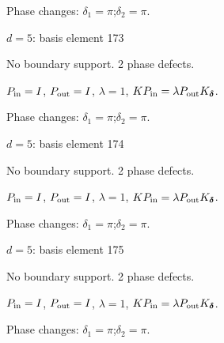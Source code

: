 \par\smallskip\begin{minipage}{.98\linewidth}\small Phase changes: $\delta_{1}=\pi$;\quad $\delta_{2}=\pi$.\end{minipage}
\vfill
{\footnotesize\texttt{}}
\newpage
{}
{\Large $d=5$: basis element 173}\par
No boundary support. 2 phase defects.
\begin{center}
\end{center}
\vspace{-1mm}
$P_{\rm in}=I$, \quad $P_{\rm out}=I$, \quad $\lambda=1$, \qquad $K P_{\rm in}=\lambda P_{\rm out}K_{\boldsymbol\delta}$.
\par\smallskip\begin{minipage}{.98\linewidth}\small Phase changes: $\delta_{1}=\pi$;\quad $\delta_{2}=\pi$.\end{minipage}
\vfill
{\footnotesize\texttt{}}
\newpage
{}
{\Large $d=5$: basis element 174}\par
No boundary support. 2 phase defects.
\begin{center}
\end{center}
\vspace{-1mm}
$P_{\rm in}=I$, \quad $P_{\rm out}=I$, \quad $\lambda=1$, \qquad $K P_{\rm in}=\lambda P_{\rm out}K_{\boldsymbol\delta}$.
\par\smallskip\begin{minipage}{.98\linewidth}\small Phase changes: $\delta_{1}=\pi$;\quad $\delta_{2}=\pi$.\end{minipage}
\vfill
{\footnotesize\texttt{}}
\newpage
{}
{\Large $d=5$: basis element 175}\par
No boundary support. 2 phase defects.
\begin{center}
\end{center}
\vspace{-1mm}
$P_{\rm in}=I$, \quad $P_{\rm out}=I$, \quad $\lambda=1$, \qquad $K P_{\rm in}=\lambda P_{\rm out}K_{\boldsymbol\delta}$.
\par\smallskip\begin{minipage}{.98\linewidth}\small Phase changes: $\delta_{1}=\pi$;\quad $\delta_{2}=\pi$.\end{minipage}

